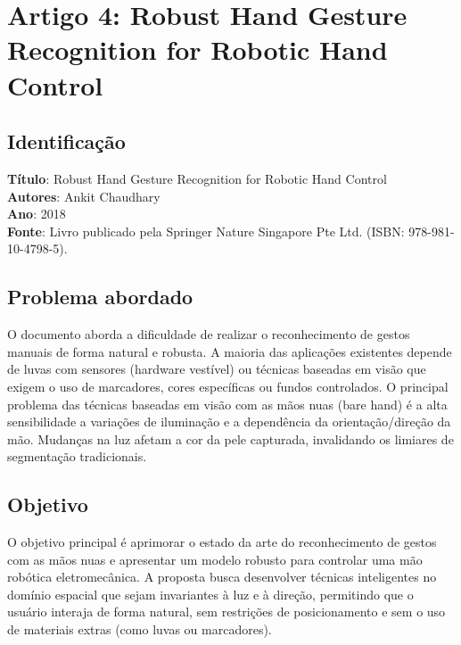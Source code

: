 \documentclass[12pt, a4paper]{article}
\begin{document}
\section{Artigo 4: Robust Hand Gesture Recognition for Robotic Hand Control}
\subsection{Identificação}
\textbf{Título}: Robust Hand Gesture Recognition for Robotic Hand Control\\
\textbf{Autores}: Ankit Chaudhary\\
\textbf{Ano}: 2018\\
\textbf{Fonte}: Livro publicado pela Springer Nature Singapore Pte Ltd. (ISBN: 978-981-10-4798-5).\\
\subsection{Problema abordado}
O documento aborda a dificuldade de realizar o reconhecimento de gestos manuais de forma natural e robusta. A maioria das aplicações existentes depende de luvas com sensores (hardware vestível) ou técnicas baseadas em visão que exigem o uso de marcadores, cores específicas ou fundos controlados. O principal problema das técnicas baseadas em visão com as mãos nuas (bare hand) é a alta sensibilidade a variações de iluminação e a dependência da orientação/direção da mão. Mudanças na luz afetam a cor da pele capturada, invalidando os limiares de segmentação tradicionais.\\
\subsection{Objetivo}
O objetivo principal é aprimorar o estado da arte do reconhecimento de gestos com as mãos nuas e apresentar um modelo robusto para controlar uma mão robótica eletromecânica. A proposta busca desenvolver técnicas inteligentes no domínio espacial que sejam invariantes à luz e à direção, permitindo que o usuário interaja de forma natural, sem restrições de posicionamento e sem o uso de materiais extras (como luvas ou marcadores).\\
\end{document}
